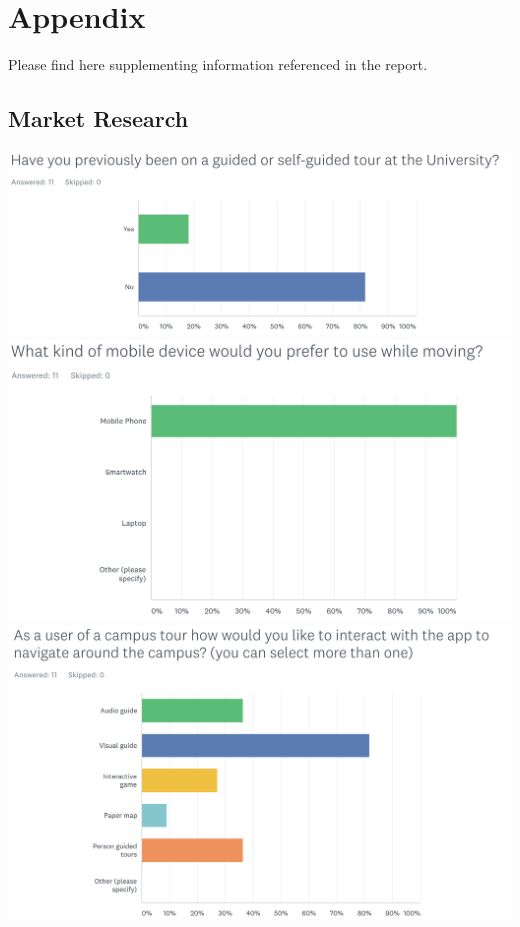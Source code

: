\documentclass[a4,10pt,twocolumn]{article}
\begin{document}
\clearpage
\newpage

\section{Appendix}
Please find here supplementing information referenced in the report.

\subsection{Market Research}
\label{res:quest}
\noindent\includegraphics[width=\columnwidth]{Question1.png}
\noindent\includegraphics[width=\columnwidth]{Question3.png}
\noindent\includegraphics[width=\columnwidth]{Question5.png}
\end{document}

